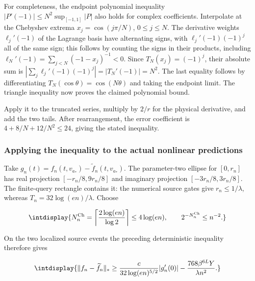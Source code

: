 
For completeness, the endpoint polynomial inequality \(|P'(-1)|\le N^2\sup_{[-1,\allowbreak 1]}|P|\) also holds for complex coefficients. Interpolate at the Chebyshev extrema \(x_j=\cos(j\pi/N)\), \(0\le j\le N\). The derivative weights \(\ell_j'(-1)\) of the Lagrange basis have alternating signs, with \(\ell_j'(-1)(-1)^j\) all of the same sign; this follows by counting the signs in their products, including \(\ell_N'(-1)=\sum_{j<N}(-1-x_j)^{-1}<0\). Since \(T_N(x_j)=(-1)^j\), their absolute sum is \(\left|\sum_j\ell_j'(-1)(-1)^j\right| =|T_N'(-1)|=N^2\). The last equality follows by differentiating \(T_N(\cos\theta)=\cos(N\theta)\) and taking the endpoint limit. The triangle inequality now proves the claimed polynomial bound.



Apply it to the truncated series, multiply by \(2/r\) for the physical derivative, and add the two tails. After rearrangement, the error coefficient is \(4+8/N+12/N^2\le24\), giving the stated inequality.


\subsubsection{Applying the inequality to the actual nonlinear predictions}



Take \(g_n(t)=f_n(t,\allowbreak v_{a_*})-\widetilde f_n(t,\allowbreak v_{a_*})\). The parameter-two ellipse for \([0,\allowbreak r_n]\) has real projection \([-r_n/8,\allowbreak 9r_n/8]\) and imaginary projection \([-3r_n/8,\allowbreak 3r_n/8]\). The finite-query rectangle contains it: the numerical source gates give \(r_n\le1/\lambda\), whereas \(T_n=32\log(en)/\lambda\). Choose


\begingroup\renewcommand{\theHequation}{intdisplay.502}
\begin{equation*}
\intdisplay{
N_n^{\rm Ch}=\left\lceil\frac{2\log(en)}{\log2}\right\rceil
\le4\log(en),\qquad 2^{-N_n^{\rm Ch}}\le n^{-2}.
}
\end{equation*}
\endgroup


On the two localized source events the preceding deterministic inequality therefore gives


\begingroup\renewcommand{\theHequation}{intdisplay.503}
\begin{equation*}
\intdisplay{
\|f_n-\widetilde f_n\|_*
\ge\frac{c}{32\log(en)^{5/2}}|g_n'(0)|
-\frac{768\beta^{6L}Y}{\lambda n^2}.
}
\end{equation*}
\endgroup

